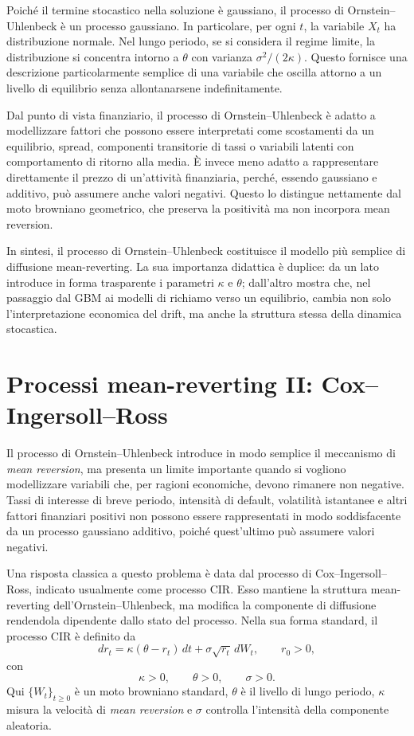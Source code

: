 Poich\'e il termine stocastico nella soluzione \`e gaussiano, il processo
di Ornstein--Uhlenbeck \`e un processo gaussiano. In particolare, per ogni
$t$, la variabile $X_t$ ha distribuzione normale. Nel lungo periodo, se
si considera il regime limite, la distribuzione si concentra intorno a
$\theta$ con varianza $\sigma^2/(2\kappa)$. Questo fornisce una
descrizione particolarmente semplice di una variabile che oscilla attorno
a un livello di equilibrio senza allontanarsene indefinitamente.

Dal punto di vista finanziario, il processo di Ornstein--Uhlenbeck \`e
adatto a modellizzare fattori che possono essere interpretati come
scostamenti da un equilibrio, spread, componenti transitorie di tassi o
variabili latenti con comportamento di ritorno alla media. \`E invece
meno adatto a rappresentare direttamente il prezzo di un'attivit\`a
finanziaria, perch\'e, essendo gaussiano e additivo, pu\`o assumere anche
valori negativi. Questo lo distingue nettamente dal moto browniano
geometrico, che preserva la positivit\`a ma non incorpora mean
reversion.

In sintesi, il processo di Ornstein--Uhlenbeck costituisce il modello
pi\`u semplice di diffusione mean-reverting. La sua importanza didattica \`e
duplice: da un lato introduce in forma trasparente i parametri
$\kappa$ e $\theta$; dall'altro mostra che, nel passaggio dal GBM ai
modelli di richiamo verso un equilibrio, cambia non solo
l'interpretazione economica del drift, ma anche la struttura stessa
della dinamica stocastica.

\section{Processi mean-reverting II: Cox--Ingersoll--Ross}

Il processo di Ornstein--Uhlenbeck introduce in modo semplice il
meccanismo di \emph{mean reversion}, ma presenta un limite importante
quando si vogliono modellizzare variabili che, per ragioni economiche,
devono rimanere non negative. Tassi di interesse di breve periodo,
intensit\`{a} di default, volatilit\`a  istantanee e altri fattori finanziari
positivi non possono essere rappresentati in modo soddisfacente da un
processo gaussiano additivo, poich\'{e} quest'ultimo pu\`{o} assumere
valori negativi.

Una risposta classica a questo problema \`{e} data dal processo di
Cox--Ingersoll--Ross, indicato usualmente come processo CIR. Esso
mantiene la struttura mean-reverting dell'Ornstein--Uhlenbeck, ma
modifica la componente di diffusione rendendola dipendente dallo stato
del processo. Nella sua forma standard, il processo CIR \`{e} definito da
\[
dr_t=\kappa(\theta-r_t)\,dt+\sigma\sqrt{r_t}\,dW_t,
\qquad
r_0>0,
\]
con
\[
\kappa>0,
\qquad
\theta>0,
\qquad
\sigma>0.
\]
Qui $\{W_t\}_{t\geq 0}$ \`{e} un moto browniano standard, $\theta$ \`{e}
il livello di lungo periodo, $\kappa$ misura la velocit\`{a} di
\emph{mean reversion} e $\sigma$ controlla l'intensit\`{a} della
componente aleatoria.

